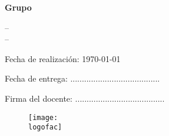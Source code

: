

\begin{titlepage}
\centering

{ \large \universidad \par }
\vspace{2cm}
{\Large \scshape \materia \par}
\vspace{2cm}
{\Huge \scshape \titulo \par }
\vspace{1cm}
{\large \bf Grupo \grupo \par}
\vspace{0cm}
\textsc{\large \autorUNO -- \legajoUNO \\ \autorDOS -- \legajoDOS}
\vspace{2cm}
{\par \large Fecha de realización: \today \par}
\vspace{1cm}
{\large Fecha de entrega: .......................................\par}
\vspace{1.5cm}
{\large Firma del docente: .......................................}
\vspace{2.5cm}
\begin{figure}[htb!]
\centering
\texttt{[image: \\logofac]}
\end{figure}
\end{titlepage}
